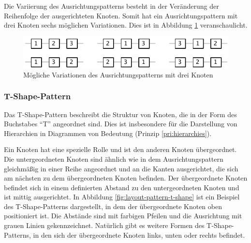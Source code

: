 Die Variierung des Ausrichtungspatterns besteht in der Veränderung der Reihenfolge der ausgerichteten Knoten. Somit hat ein Ausrichtungspattern mit drei Knoten sechs möglichen Variationen. Dies ist in Abbildung \ref{fig:layout-pattern-alignment-variations} veranschaulicht.

\vspace{0.5cm}

\begin{figure}[hbt]
    \centering
    \includegraphics[scale=1.3]{resources/layout-pattern-alignment-variations}
    \caption{Mögliche Variationen des Ausrichtungspatterns mit drei Knoten}
    \label{fig:layout-pattern-alignment-variations}
\end{figure}

\subsubsection{T-Shape-Pattern}
\label{subsubsec:t-shape-pattern}

Das T-Shape-Pattern beschreibt die Struktur von Knoten, die in der Form des Buchstabes \enquote{T} angeordnet sind. Dies ist insbesondere für die Darstellung von Hierarchien in Diagrammen von Bedeutung (Prinzip \ref{pri:hierarchies}).

Ein Knoten hat eine spezielle Rolle und ist den anderen Knoten übergeordnet. Die untergeordneten Knoten sind ähnlich wie in dem Ausrichtungspattern gleichmäßig in einer Reihe angeordnet und an die Kanten ausgerichtet, die sich am nächsten zu dem übergeordneten Knoten befinden. Der übergeordnete Knoten befindet sich in einem definierten Abstand zu den untergeordneten Knoten und ist mittig ausgerichtet. In Abbildung \ref{fig:layout-pattern-t-shape} ist ein Beispiel des T-Shape-Patterns dargestellt, in dem der übergeordnete Knoten oben positioniert ist. Die Abstände sind mit farbigen Pfeilen und die Ausrichtung mit grauen Linien gekennzeichnet. Natürlich gibt es weitere Formen des T-Shape-Patterns, in den sich der übergeordnete Knoten links, unten oder rechts befindet.

